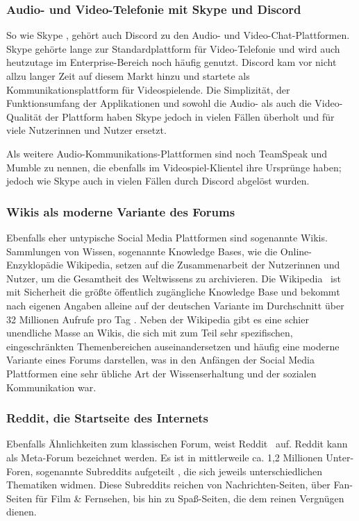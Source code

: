 \subsubsection{Audio- und Video-Telefonie mit Skype und Discord}

So wie Skype \faSkype, gehört auch Discord zu den Audio- und Video-Chat-Plattformen. Skype gehörte lange zur Standardplattform für Video-Telefonie und wird auch heutzutage im Enterprise-Bereich noch häufig genutzt. Discord kam vor nicht allzu langer Zeit auf diesem Markt hinzu und startete als Kommunikationsplattform für Videospielende. Die Simplizität, der Funktionsumfang der Applikationen und sowohl die Audio- als auch die Video-Qualität der Plattform haben Skype jedoch in vielen Fällen überholt und für viele Nutzerinnen und Nutzer ersetzt.

Als weitere Audio-Kommunikations-Plattformen sind noch TeamSpeak und Mumble zu nennen, die ebenfalls im Videospiel-Klientel ihre Ursprünge haben; jedoch wie Skype auch in vielen Fällen durch Discord abgelöst wurden.

\subsubsection{Wikis als moderne Variante des Forums}

Ebenfalls eher untypische Social Media Plattformen sind sogenannte Wikis. Sammlungen von Wissen, sogenannte Knowledge Bases, wie die Online-Enzyklopädie Wikipedia, setzen auf die Zusammenarbeit der Nutzerinnen und Nutzer, um die Gesamtheit des Weltwissens zu archivieren. Die Wikipedia \faWikipediaW\ ist mit Sicherheit die größte öffentlich zugängliche Knowledge Base und bekommt nach eigenen Angaben alleine auf der deutschen Variante im Durchschnitt über 32 Millionen Aufrufe pro Tag \cite{wikipediastatistik}. Neben der Wikipedia gibt es eine schier unendliche Masse an Wikis, die sich mit zum Teil sehr spezifischen, eingeschränkten Themenbereichen auseinandersetzen und häufig eine moderne Variante eines Forums darstellen, was in den Anfängen der Social Media Plattformen eine sehr übliche Art der Wissenserhaltung und der sozialen Kommunikation war.

\subsubsection{Reddit, die Startseite des Internets}

Ebenfalls Ähnlichkeiten zum klassischen Forum, weist Reddit \faReddit\ auf. Reddit kann als Meta-Forum bezeichnet werden. Es ist in mittlerweile ca. 1,2 Millionen Unter-Foren, sogenannte Subreddits aufgeteilt \cite{redditmetrics}, die sich jeweils unterschiedlichen Thematiken widmen. Diese Subreddits reichen von Nachrichten-Seiten, über Fan-Seiten für Film \& Fernsehen, bis hin zu Spaß-Seiten, die dem reinen Vergnügen dienen.

